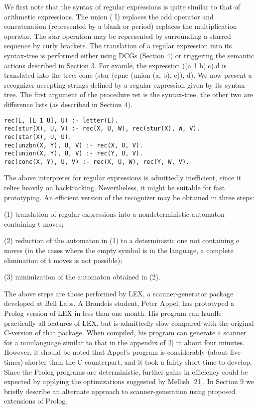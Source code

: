 \label{cohen6}

We first note that the syntax of regular expressions is quite similar to that of
arithmetic expressions. The union ( I) replaces the add operator and concatenation
(represented by a blank or period) replaces the multiplication operator. The
star operation may be represented by surrounding a starred sequence by curly
brackets. The translation of a regular expression into its syntax-tree is performed
either using DCGs (Section 4) or triggering the semantic actions described in
Section 3. For examle, the expression ((a 1 b).c).d is translated into the tree:
cone (star (cpnc (union (a, b), c)), d). We now present a recognizer accepting strings
defined by a regular expression given by its syntax-tree. The first argument of
the procedure ret is the syntax-tree, the other two are difference lists (as described
in Section 4).
\begin{verbatim}
rec(L, [L 1 U], U) :- letter(L).
rec(stur(X), U, V) :- rec(X, U, W), rec(stur(X), W, V).
rec(star(X), U, U).
rec(unzbn(X, Y), U, V) :- rec(X, U, V).
rec(union(X, Y), U, V) :- rec(Y, U, V).
rec(conc(X, Y), U, V) :- rec(X, U, W), rec(Y, W, V).  
\end{verbatim}
The above interpreter for regular expressions is admittedly inefficient, since it
relies heavily on backtracking. Nevertheless, it might be suitable for fast prototyping.
An efficient version of the recognizer may be obtained in three steps:

(1) translation of regular expressions into a nondeterministic automaton containing
t moves;

(2) reduction of the automaton in (1) to a deterministic one not containing e
moves (in the cases where the empty symbol is in the language, a complete
elimination of t moves is not possible);

(3) minimization of the automaton obtained in (2). 

The above steps are those performed by LEX, a scanner-generator package
developed at Bell Labs. A Brandeis student, Peter Appel, has prototyped a Prolog
version of LEX in less than one month. His program can handle practically all
features of LEX, but is admittedly slow compared with the original C-version of
that package. When compiled, his program can generate a scanner for a minilanguage
similar to that in the appendix of [l] in about four minutes. However,
it should be noted that Appel’s program is considerably (about five times) shorter
than the C-counterpart, and it took a fairly short time to develop. Since the
Prolog programs are deterministic, further gains in efficiency could be expected
by applying the optimizations suggested by Mellish [21]. In Section 9 we briefly
describe an alternate approach to scanner-generation using proposed extensions
of Prolog. 

